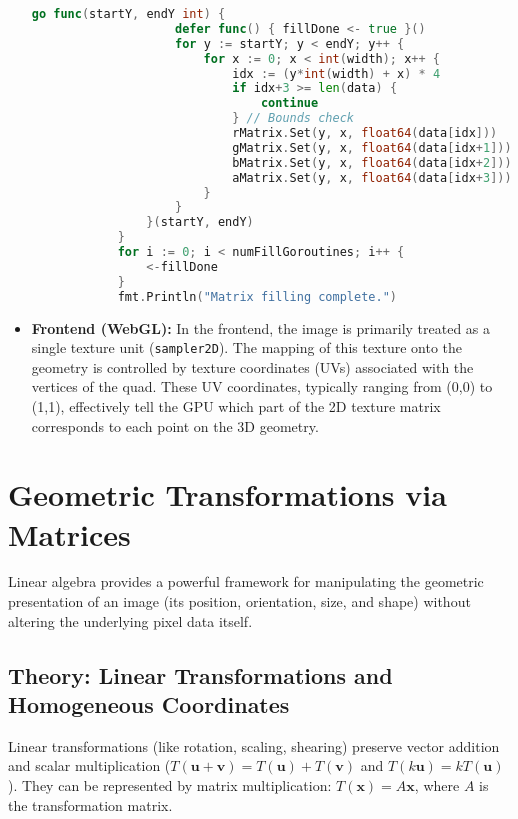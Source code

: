 \documentclass{article}
\begin{document}
\begin{itemize}
\begin{lstlisting}[language=Go, caption={Go code snippet: Creating channel matrices (Illustrative)}, label={lst:matrix_creation}]
                go func(startY, endY int) {
                    defer func() { fillDone <- true }()
                    for y := startY; y < endY; y++ {
                        for x := 0; x < int(width); x++ {
                            idx := (y*int(width) + x) * 4
                            if idx+3 >= len(data) {
                                continue
                            } // Bounds check
                            rMatrix.Set(y, x, float64(data[idx]))
                            gMatrix.Set(y, x, float64(data[idx+1]))
                            bMatrix.Set(y, x, float64(data[idx+2]))
                            aMatrix.Set(y, x, float64(data[idx+3]))
                        }
                    }
                }(startY, endY)
            }
            for i := 0; i < numFillGoroutines; i++ {
                <-fillDone
            }
            fmt.Println("Matrix filling complete.")
        \end{lstlisting}
    \item \textbf{Frontend (WebGL):} In the frontend, the image is primarily treated as a single texture unit (\texttt{sampler2D}). The mapping of this texture onto the geometry is controlled by texture coordinates (UVs) associated with the vertices of the quad. These UV coordinates, typically ranging from (0,0) to (1,1), effectively tell the GPU which part of the 2D texture matrix corresponds to each point on the 3D geometry.
\end{itemize}

\section{Geometric Transformations via Matrices}
\label{sec:transformations}
Linear algebra provides a powerful framework for manipulating the geometric presentation of an image (its position, orientation, size, and shape) without altering the underlying pixel data itself.

\subsection{Theory: Linear Transformations and Homogeneous Coordinates}
Linear transformations (like rotation, scaling, shearing) preserve vector addition and scalar multiplication ($T(\mathbf{u}+\mathbf{v})=T(\mathbf{u})+T(\mathbf{v})$ and $T(k\mathbf{u})=k T(\mathbf{u})$). They can be represented by matrix multiplication: $T(\mathbf{x}) = A \mathbf{x}$, where $A$ is the transformation matrix.
\end{document}
